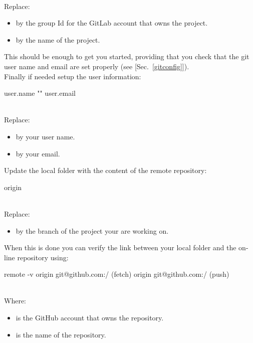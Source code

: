 \begin{itemize}
\begin{itemize}
{{}}
\\[-0.75cm]
\noindent Replace:
\begin{itemize}
\item {}\quad by the group Id for the GitLab account that owns the project.
\item {}\quad by the name of the project. \\
\end{itemize}
\end{itemize}
This should be enough to get you started, providing that you check that the git user name and email are set properly (see [Sec.~\ref{gitconfig}]). \\[0.25cm]
Finally if needed setup the user information:
{\footnotesize{
\begin{scripti}
\fprompt{~}   user.name ""
\fprompt{~}   user.email \dctt{\email}
\end{scripti}
}}
\\[-0.75cm]
\noindent Replace:
\begin{itemize}
\item {}\quad by your user name. 
\item \btt{\email}\quad by your email. \\
\end{itemize}
Update the local folder with the content of the remote repository:
{\footnotesize{
\begin{scripti}
  origin 
\end{scripti}
}}
\\[-0.75cm]
\noindent Replace:
\begin{itemize}
\item {}\quad by the branch of the project your are working on. 
\end{itemize} 
\end{itemize}
When this is done you can verify the link between your local folder and the on-line repository using:
\begin{script}
  remote -v
origin	git@github.com:/ (fetch)
origin	git@github.com:/ (push)
\end{script}
\\[-0.5cm]
\noindent Where:
\begin{itemize}
\item {}\quad is the GitHub account that owns the repository.
\item {}\quad is the name of the repository. 
\end{itemize}

